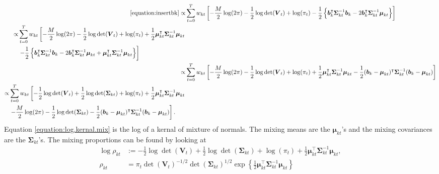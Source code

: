\documentclass[11pt,authoryear]{article}
\newcommand{\bs}[1]{\boldsymbol{#1}}
\begin{document}
\begin{align}
\eqref{equation:insertbk} \propto& \sum_{t = 0}^Tw_{kt}\left[-\frac{M}{2}\log(2\pi) - \frac{1}{2}\log\det(\bs{V}_t) +  \log(\pi_t) - \frac{1}{2}\left\{\bs{b}_k^{\intercal}\bs{\Sigma}_{kt}^{-1}\bs{b}_k - 2\bs{b}_k^{\intercal}\bs{\Sigma}_{kt}^{-1}\bs{\mu}_{kt} \right\} \right]\\
\begin{split}
\propto& \sum_{t = 0}^Tw_{kt}\left[-\frac{M}{2}\log(2\pi) - \frac{1}{2}\log\det(\bs{V}_t) +  \log(\pi_t) + \frac{1}{2}\bs{\mu}_{kt}^{\intercal}\bs{\Sigma}_{kt}^{-1}\bs{\mu}_{kt}\right.\\
&\left. - \frac{1}{2}\left\{\bs{b}_k^{\intercal}\bs{\Sigma}_{kt}^{-1}\bs{b}_k - 2\bs{b}_k^{\intercal}\bs{\Sigma}_{kt}^{-1}\bs{\mu}_{kt} + \bs{\mu}_{kt}^{\intercal}\bs{\Sigma}_{kt}^{-1}\bs{\mu}_{kt} \right\}\right]
\end{split}\\
\propto& \sum_{t = 0}^Tw_{kt}\left[-\frac{M}{2}\log(2\pi) - \frac{1}{2}\log\det(\bs{V}_t) +  \log(\pi_t) + \frac{1}{2}\bs{\mu}_{kt}^{\intercal}\bs{\Sigma}_{kt}^{-1}\bs{\mu}_{kt} - \frac{1}{2}(\bs{b}_k - \bs{\mu}_{kt})^{\intercal}\bs{\Sigma}_{kt}^{-1}(\bs{b}_k - \bs{\mu}_{kt})\right]\\
\begin{split}
  \label{equation:log.kernal.mix}
  \propto& \sum_{t = 0}^Tw_{kt}\left[ - \frac{1}{2}\log\det(\bs{V}_t) + \frac{1}{2}\log\det(\bs{\Sigma}_{kt}) +  \log(\pi_t) + \frac{1}{2}\bs{\mu}_{kt}^{\intercal}\bs{\Sigma}_{kt}^{-1}\bs{\mu}_{kt}\right.\\
    &\left.-\frac{M}{2}\log(2\pi) - \frac{1}{2}\log\det(\bs{\Sigma}_{kt}) - \frac{1}{2}(\bs{b}_k - \bs{\mu}_{kt})^{\intercal}\bs{\Sigma}_{kt}^{-1}(\bs{b}_k - \bs{\mu}_{kt})\right].
\end{split}
\end{align}
Equation \eqref{equation:log.kernal.mix} is the log of a kernal of
mixture of normals. The mixing means are the $\bs{\mu}_{kt}$'s and the
mixing covariances are the $\bs{\Sigma}_{kt}$'s. The mixing proportions can be found by looking at
\begin{align}
\log\rho_{kt} &:= - \frac{1}{2}\log\det(\bs{V}_t) + \frac{1}{2}\log\det(\bs{\Sigma}_{kt}) +  \log(\pi_t) + \frac{1}{2}\bs{\mu}_{kt}^{\intercal}\bs{\Sigma}_{kt}^{-1}\bs{\mu}_{kt},\\
\rho_{kt} &= \pi_t\det(\bs{V}_t)^{-1/2}\det(\bs{\Sigma}_{kt})^{1/2}\exp\left\{\frac{1}{2}\bs{\mu}_{kt}^{\intercal}\bs{\Sigma}_{kt}^{-1}\bs{\mu}_{kt}\right\}
\end{align}
\end{document}
